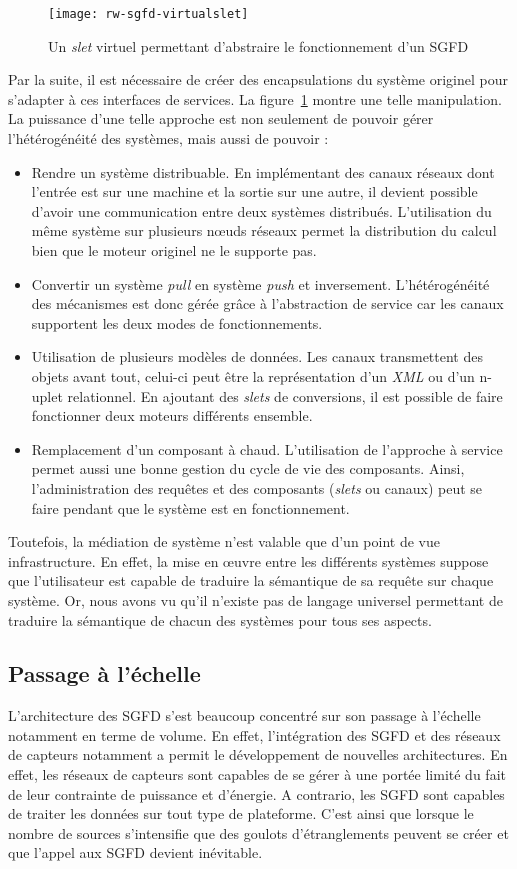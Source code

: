 \begin{figure}
    \centering
    \texttt{[image: rw-sgfd-virtualslet]}
    \caption{Un \textit{slet} virtuel permettant d'abstraire le fonctionnement d'un SGFD}\label{fig:rw:sgfd:virtualslet}
\end{figure}
Par la suite, il est nécessaire de créer des encapsulations du système originel pour s'adapter à ces interfaces de services. La figure~\ref{fig:rw:sgfd:virtualslet} montre une telle manipulation. La puissance d'une telle approche est non seulement de pouvoir gérer l'hétérogénéité des systèmes, mais aussi de pouvoir :
\begin{itemize}
	\item Rendre un système distribuable. En implémentant des canaux réseaux dont l'entrée est sur une machine et la sortie sur une autre, il devient possible d'avoir une communication entre deux systèmes distribués. L'utilisation du même système sur plusieurs nœuds réseaux permet la distribution du calcul bien que le moteur originel ne le supporte pas.
	\item Convertir un système \textit{pull} en système \textit{push} et inversement. L'hétérogénéité des mécanismes est donc gérée grâce à l'abstraction de service car les canaux supportent les deux modes de fonctionnements.
	\item Utilisation de plusieurs modèles de données. Les canaux transmettent des objets avant tout, celui-ci peut être la représentation d'un \textit{XML} ou d'un n-uplet relationnel. En ajoutant des \textit{slets} de conversions, il est possible de faire fonctionner deux moteurs différents ensemble.
	\item Remplacement d'un composant à chaud. L'utilisation de l'approche à service permet aussi une bonne gestion du cycle de vie des composants. Ainsi, l'administration des requêtes et des composants (\textit{slets} ou canaux) peut se faire pendant que le système est en fonctionnement.
\end{itemize}

Toutefois, la médiation de système n'est valable que d'un point de vue infrastructure. En effet, la mise en œuvre entre les différents systèmes suppose que l'utilisateur est capable de traduire la sémantique de sa requête sur chaque système. Or, nous avons vu qu'il n'existe pas de langage universel permettant de traduire la sémantique de chacun des systèmes pour tous ses aspects.

\subsection{Passage à l'échelle}
L'architecture des SGFD s'est beaucoup concentré sur son passage à l'échelle notamment en terme de volume. En effet, l'intégration des SGFD et des réseaux de capteurs notamment a permit le développement de nouvelles architectures. En effet, les réseaux de capteurs sont capables de se gérer à une portée limité du fait de leur contrainte de puissance et d'énergie. A contrario, les SGFD sont capables de traiter les données sur tout type de plateforme. C'est ainsi que lorsque le nombre de sources s'intensifie que des goulots d'étranglements peuvent se créer et que l'appel aux SGFD devient inévitable.

